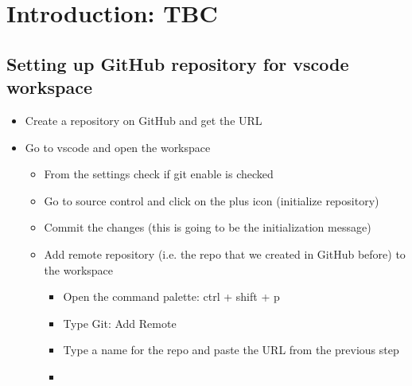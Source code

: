 
\section{Introduction: TBC}
\subsection{Setting up GitHub repository for vscode workspace}
\begin{itemize}
    \item Create a repository on GitHub and get the URL %
    \item Go to vscode and open the workspace
    \begin{itemize}
        \item From the settings check if git enable is checked
        \item Go to source control and click on the plus icon (initialize repository)
        \item Commit the changes (this is going to be the initialization message)
        \item Add remote repository (i.e. the repo that we created in GitHub before) to the workspace
        \begin{itemize}
            \item Open the command palette: ctrl + shift + p
            \item Type Git: Add Remote
            \item Type a name for the repo and paste the URL from the previous step
            \item 
        \end{itemize}
    \end{itemize}
\end{itemize}









\endinput
